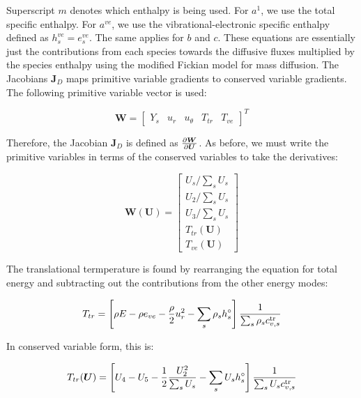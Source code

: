 \documentclass[10pt]{article}
\begin{document}
\begin{flushleft}
Superscript $m$ denotes which enthalpy is being used. For $a^1$, we use the total specific enthalpy. For $a^{ve}$, we use the vibrational-electronic specific enthalpy defined as $h_s^{ve} = e_s^{ve}$. The same applies for $b$ and $c$. These equations are essentially just the contributions from each species towards the diffusive fluxes multiplied by the species enthalpy using the modified Fickian model for mass diffusion. The Jacobians $\boldsymbol{J}_D$ maps primitive variable gradients to conserved variable gradients. The following primitive variable vector is used:

\begin{equation*}
    \boldsymbol{W} = \begin{bmatrix}
        Y_s & u_r & u_\theta & T_{tr} & T_{ve}  
    \end{bmatrix}^T
\end{equation*}

Therefore, the Jacobian $\boldsymbol{J}_D$ is defined as $ \frac{\partial \boldsymbol{W}}{\partial \boldsymbol{U}}$. As before, we must write the primitive variables in terms of the conserved variables to take the derivatives:

\begin{equation*}
    \boldsymbol{W}(\boldsymbol{U}) = \begin{bmatrix}
        U_s / \sum_s U_s \\
        U_2 / \sum_s U_s \\
        U_3 / \sum_s U_s \\
        T_{tr}(\boldsymbol{U}) \\
        T_{ve}(\boldsymbol{U})
    \end{bmatrix}
\end{equation*}

The translational termperature is found by rearranging the equation for total energy and subtracting out the contributions from the other energy modes:

\begin{equation*}
    T_{tr} = \left[ \rho E - \rho e_{ve} - \frac{\rho}{2} u_r^2 - \sum_s \rho_s h_s^\circ \right] \frac{1}{\sum_s \rho_s c_{v,s}^\text{tr}}
\end{equation*}

In conserved variable form, this is:

\begin{equation*}
    T_{tr}(\boldsymbol{U}) = \left[ U_4 - U_5 - \frac{1}{2} \frac{U_2^2}{\sum_s U_s} - \sum_s U_s h_s^\circ \right] \frac{1}{\sum_s U_s c_{v,s}^\text{tr}}
\end{equation*}


\end{flushleft}
\end{document}
